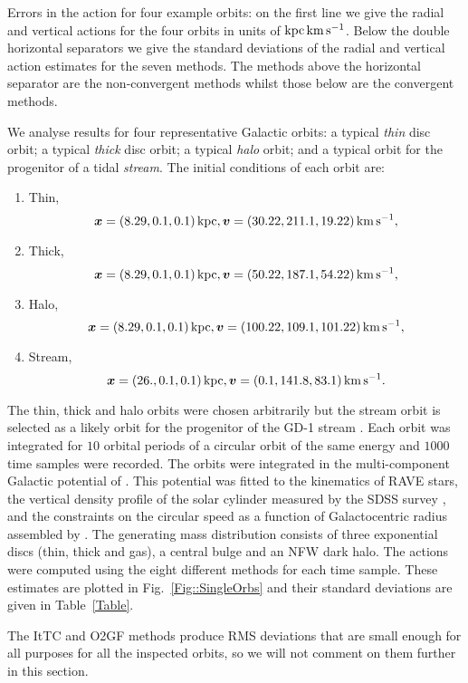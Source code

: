 \documentclass[useAMS,usenatbib,fleqn,a4paper]{mn2e}
\def\kpc{\,{\rm kpc}}
\def\kms{\,{\rm km\,s^{-1}}}
\newcommand{\bs}[1]{\bmath{#1}}
\begin{document}
\begin{table*}
\caption{Errors in the action for four example orbits: on the first line we give the
radial and vertical actions for the four orbits in units of $\!\kpc\kms$. Below
the double horizontal separators we give the standard deviations of the
radial and vertical action estimates for the seven methods. The methods above
the horizontal separator are the non-convergent methods whilst those below
are the convergent methods.}  \label{Table}
\end{table*}

We
analyse results for four representative Galactic orbits: a typical
\emph{thin} disc orbit; a typical \emph{thick} disc orbit; a typical
\emph{halo} orbit; and a typical orbit for the progenitor of a tidal
\emph{stream}. The initial conditions of each orbit are:
\begin{enumerate}
\item Thin, 
$$\bs{x} = (8.29,0.1,0.1)\kpc, \bs{v}=(30.22,211.1,19.22)\kms,$$
\item Thick, $$\bs{x} = (8.29,0.1,0.1)\kpc, \bs{v}=(50.22,187.1,54.22)\kms,$$
\item Halo, $$\bs{x} = (8.29,0.1,0.1)\kpc, \bs{v}=(100.22,109.1,101.22)\kms,$$
\item Stream, $$\bs{x} = (26.,0.1,0.1)\kpc, \bs{v}=(0.1,141.8,83.1)\kms.$$
\end{enumerate}
The thin, thick and halo orbits were chosen arbitrarily but the stream orbit
is selected as a likely orbit for the progenitor of the GD-1 stream
\citep{Koposov2010,SandersBinney2013b}. Each orbit was integrated for $10$
orbital periods of a circular orbit of the same energy and $1000$ time
samples were recorded.  The orbits were integrated in the multi-component
Galactic potential of \cite{Piffl2014}. This potential was fitted to the
kinematics of RAVE stars, the vertical density profile of the solar cylinder
measured by the SDSS survey \citep{Juric2008}, and the constraints on the
circular speed as a function of Galactocentric radius assembled by
\cite{McMillan2011}.  The generating mass distribution consists of three
exponential discs (thin, thick and gas), a central bulge and an NFW dark
halo. The actions were computed using the eight different methods for each
time sample.  These estimates are plotted in Fig.~\ref{Fig::SingleOrbs} and
their standard deviations are given in Table~\ref{Table}.

The ItTC and O2GF methods produce RMS deviations
that are small enough for all purposes for all the inspected orbits, so we
will not comment on them further in this section.
\end{document}
